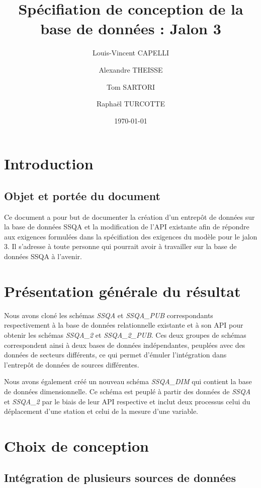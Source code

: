 \documentclass{article}
\begin{document}
\title{Spécifiation de conception de la base de données : Jalon 3}

\author{Louis-Vincent CAPELLI \and Alexandre THEISSE \and Tom SARTORI \and Raphaël TURCOTTE}
\date{\today}
\maketitle
\newpage

\tableofcontents
\newpage

\section{Introduction}
\subsection*{Objet et portée du document}
Ce document a pour but de documenter la création d'un entrepôt de données
sur la base de données SSQA et la modification de l'API existante afin de répondre aux 
exigences formulées dans la spécifiation des exigences du modèle pour le jalon 3.
Il s'adresse à toute personne qui pourrait avoir à travailler sur la base de données
SSQA à l'avenir.

\section{Présentation générale du résultat}
Nous avons cloné les schémas \textit{SSQA} et \textit{SSQA\_PUB} correspondants respectivement à
la base de données relationnelle existante et à son API pour obtenir les schémas \textit{SSQA\_2}
et \textit{SSQA\_2\_PUB}. Ces deux groupes de schémas correspondent ainsi à deux bases de données
indépendantes, peuplées avec des données de secteurs différents,
ce qui permet d'émuler l'intégration dans l'entrepôt de données de sources différentes.

Nous avons également créé un nouveau schéma \textit{SSQA\_DIM} qui contient la base de données
dimensionnelle. Ce schéma est peuplé à partir des données de \textit{SSQA} et \textit{SSQA\_2}
par le biais de leur API respective et inclut deux processus celui du déplacement
d'une station et celui de la mesure d'une variable.

\section{Choix de conception}
\subsection{Intégration de plusieurs sources de données}
\end{document}

